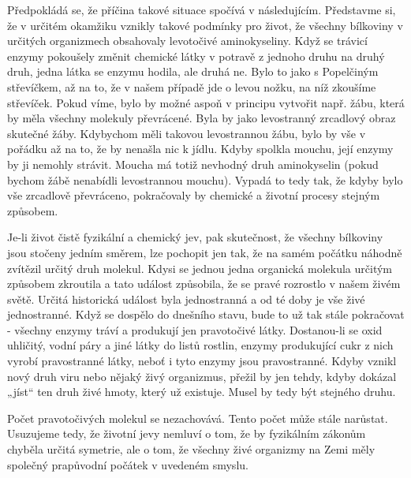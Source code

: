     Předpokládá se, že příčina takové situace spočívá v následujícím. Představme si, že v určitém
    okamžiku vznikly takové podmínky pro život, že všechny bílkoviny v určitých organizmech
    obsahovaly levotočivé aminokyseliny. Když se trávicí enzymy pokoušely změnit chemické látky v
    potravě z jednoho druhu na druhý druh, jedna látka se enzymu hodila, ale druhá ne. Bylo to jako
    s Popelčiným střevíčkem, až na to, že v našem případě jde o levou nožku, na níž zkoušíme
    střevíček. Pokud víme, bylo by možné aspoň v principu vytvořit např. žábu, která by měla všechny
    molekuly převrácené. Byla by jako levostranný zrcadlový obraz skutečné žáby. Kdybychom měli
    takovou levostrannou žábu, bylo by vše v pořádku až na to, že by nenašla nic k jídlu. Kdyby
    spolkla mouchu, její enzymy by ji nemohly strávit. Moucha má totiž nevhodný druh aminokyselin
    (pokud bychom žábě nenabídli levostrannou mouchu). Vypadá to tedy tak, že kdyby bylo vše
    zrcadlově převráceno, pokračovaly by chemické a životní procesy stejným způsobem.

    Je-li život čistě fyzikální a chemický jev, pak skutečnost, že všechny bílkoviny jsou stočeny
    jedním směrem, lze pochopit jen tak, že na samém počátku náhodně zvítězil určitý druh molekul.
    Kdysi se jednou jedna organická molekula určitým způsobem zkroutila a tato událost způsobila, že
    se pravé rozrostlo v našem živém světě. Určitá historická událost byla jednostranná a od té doby
    je vše živé jednostranné. Když se dospělo do dnešního stavu, bude to už tak stále pokračovat -
    všechny enzymy tráví a produkují jen pravotočivé látky. Dostanou-li se oxid uhličitý, vodní páry
    a jiné látky do listů rostlin, enzymy produkující cukr z nich vyrobí pravostranné látky, neboť i
    tyto enzymy jsou pravostranné. Kdyby vznikl nový druh viru nebo nějaký živý organizmus, přežil
    by jen tehdy, kdyby dokázal „jíst“ ten druh živé hmoty, který už existuje. Musel by tedy být
    stejného druhu.

    Počet pravotočivých molekul se nezachovává. Tento počet může stále narůstat. Usuzujeme tedy, že
    životní jevy nemluví o tom, že by fyzikálním zákonům chyběla určitá symetrie, ale o tom, že
    všechny živé organizmy na Zemi měly společný prapůvodní počátek v uvedeném smyslu.

